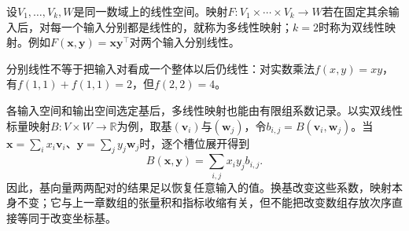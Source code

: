 设$V_1,\ldots,V_k,W$是同一数域上的线性空间。映射$F:V_1\times\cdots\times V_k\to W$若在固定其余输入后，对每一个输入分别都是线性的，就称为多线性映射；$k=2$时称为双线性映射。例如$F(\bm x,\bm y)=\bm x\bm y^\top$对两个输入分别线性。

分别线性不等于把输入对看成一个整体以后仍线性：对实数乘法$f(x,y)=xy$，有$f(1,1)+f(1,1)=2$，但$f(2,2)=4$。

各输入空间和输出空间选定基后，多线性映射也能由有限组系数记录。以实双线性标量映射$B:V\times W\to\mathbb R$为例，取基$(\bm v_i)$与$(\bm w_j)$，令$b_{i,j}=B(\bm v_i,\bm w_j)$。当$\bm x=\sum_i x_i\bm v_i$、$\bm y=\sum_j y_j\bm w_j$时，逐个槽位展开得到
\[
 B(\bm x,\bm y)=\sum_{i,j}x_i y_j b_{i,j}.
\]
因此，基向量两两配对的结果足以恢复任意输入的值。换基改变这些系数，映射本身不变；它与上一章数组的张量积和指标收缩有关，但不能把改变数组存放次序直接等同于改变坐标基。
